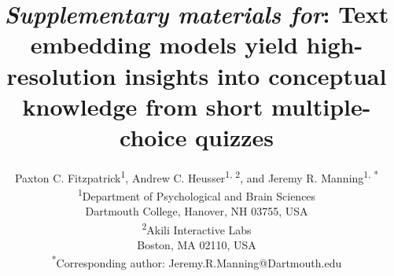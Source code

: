 \documentclass[10pt]{article}
\title{\textit{Supplementary materials for}: Text embedding models yield 
high-resolution insights into conceptual knowledge from short multiple-choice
quizzes}
\author{Paxton C. Fitzpatrick\textsuperscript{1},
Andrew C. Heusser\textsuperscript{1, 2}, and Jeremy R.
Manning\textsuperscript{1, *}\\\small{\textsuperscript{1}Department of Psychological and Brain Sciences}\\\small{Dartmouth College, Hanover, NH 03755, USA}\\\small{\textsuperscript{2}Akili Interactive Labs}\\\small{Boston, MA 02110, USA}\\\small{\textsuperscript{*}Corresponding author:
Jeremy.R.Manning@Dartmouth.edu}}
\date{}
\begin{document}
\renewcommand{\figurename}{Supplementary Figure}
\renewcommand{\tablename}{Supplementary Table}


\setcounter{equation}{0}
\setcounter{figure}{0}
\setcounter{table}{0}
\setcounter{page}{1}
\setcounter{section}{0}
\makeatletter


\begin{titlepage}
\maketitle
\end{titlepage}


\begin{tiny}
\renewcommand*{\arraystretch}{1.4}
\begin{longtable}{r|p{0.375in}|p{1.275in}|p{0.75in}|p{0.75in}|p{0.75in}|p{0.75in}}


\end{longtable}
\end{tiny}
\end{document}

